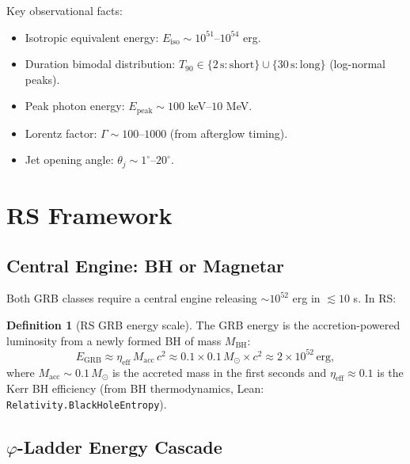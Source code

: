 \documentclass[12pt,a4paper]{article}
\theoremstyle{definition}
\newtheorem{definition}[theorem]{Definition}
\theoremstyle{remark}
\begin{document}
Key observational facts:
\begin{itemize}
  \item Isotropic equivalent energy: $E_\mathrm{iso} \sim 10^{51}$--$10^{54}$ erg.
  \item Duration bimodal distribution: $T_{90} \in \{2\,\mathrm{s}: \mathrm{short}\} \cup
        \{30\,\mathrm{s}: \mathrm{long}\}$ (log-normal peaks).
  \item Peak photon energy: $E_\mathrm{peak} \sim 100$ keV--$10$ MeV.
  \item Lorentz factor: $\Gamma \sim 100$--$1000$ (from afterglow timing).
  \item Jet opening angle: $\theta_j \sim 1^\circ$--$20^\circ$.
\end{itemize}

\section{RS Framework}
\label{sec:rs}

\subsection{Central Engine: BH or Magnetar}

Both GRB classes require a central engine releasing $\sim 10^{52}$ erg
in $\lesssim 10$ s.  In RS:

\begin{definition}[RS GRB energy scale]
The GRB energy is the accretion-powered luminosity from a newly formed
BH of mass $M_\mathrm{BH}$:
\begin{equation}
  E_\mathrm{GRB} \approx \eta_\mathrm{eff}\,M_\mathrm{acc}\,c^2
  \approx 0.1 \times 0.1\,M_\odot \times c^2
  \approx 2 \times 10^{52}\,\mathrm{erg},
  \label{eq:EGRB}
\end{equation}
where $M_\mathrm{acc} \sim 0.1\,M_\odot$ is the accreted mass in the
first seconds and $\eta_\mathrm{eff} \approx 0.1$ is the Kerr BH
efficiency (from BH thermodynamics, Lean: \texttt{Relativity.BlackHoleEntropy}).
\end{definition}

\subsection{$\varphi$-Ladder Energy Cascade}
\end{document}
